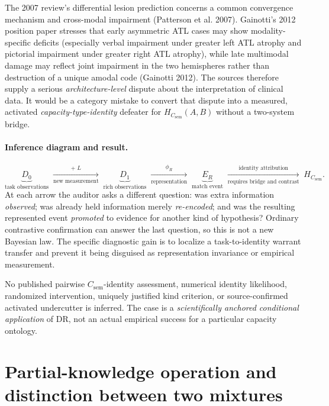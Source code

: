 \documentclass[11pt]{article}
\begin{document}
The 2007 review's differential lesion prediction concerns a common convergence mechanism and cross-modal impairment (Patterson et al. 2007). Gainotti's 2012 position paper stresses that early asymmetric ATL cases may show modality-specific deficits (especially verbal impairment under greater left ATL atrophy and pictorial impairment under greater right ATL atrophy), while late multimodal damage may reflect joint impairment in the two hemispheres rather than destruction of a unique amodal code (Gainotti 2012). The sources therefore supply a serious \emph{architecture-level} dispute about the interpretation of clinical data. It would be a category mistake to convert that dispute into a measured, activated \emph{capacity-type-identity} defeater for \(H_{C_{\mathrm{sem}}}(A,B)\) without a two-system bridge.

\paragraph{Inference diagram and result.}
\[
\underbrace{D_0}_{\text{task observations}}
\;\xrightarrow[\text{new measurement}]{+\;L}\;
\underbrace{D_1}_{\text{rich observations}}
\;\xrightarrow[\text{representation}]{\phi_R}\;
\underbrace{E_R}_{\text{match event}}
\;\xrightarrow[\text{requires bridge and contrast}]{\text{identity attribution}}\;
H_{C_{\mathrm{sem}}}.
\]
At each arrow the auditor asks a different question: was extra information \emph{observed}; was already held information merely \emph{re-encoded}; and was the resulting represented event \emph{promoted} to evidence for another kind of hypothesis? Ordinary contrastive confirmation can answer the last question, so this is not a new Bayesian law. The specific diagnostic gain is to localize a task-to-identity warrant transfer and prevent it being disguised as representation invariance or empirical measurement.

No published pairwise \(C_{\mathrm{sem}}\)-identity assessment, numerical identity likelihood, randomized intervention, uniquely justified kind criterion, or source-confirmed activated undercutter is inferred. The case is a \emph{scientifically anchored conditional application} of DR, not an actual empirical success for a particular capacity ontology.


\section{Partial-knowledge operation and distinction between two mixtures}
\end{document}
